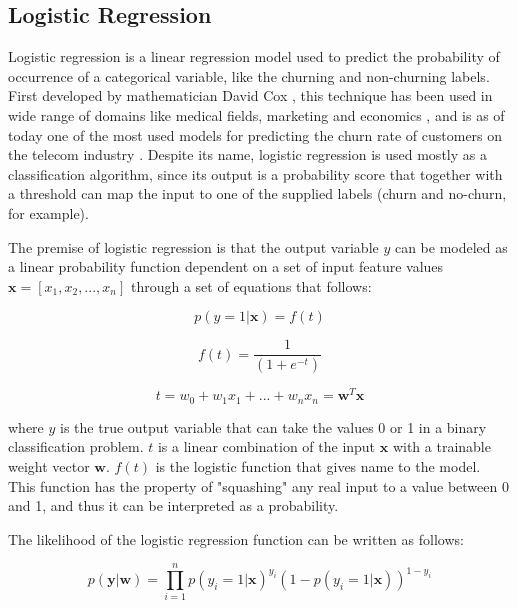 \documentclass{kththesis}
\begin{document}
\subsection{Logistic Regression}

Logistic regression is a linear regression model used to predict the probability of occurrence of a categorical variable, like the churning and non-churning labels. First developed by mathematician David Cox \citep{cox1958regression}, this technique has been used in wide range of domains like medical fields, marketing and economics , and is as of today one of the most used models for predicting the churn rate of customers on the telecom industry \citep{mahajan2015review}. Despite its name, logistic regression is used mostly as a classification algorithm, since its output is a probability score that together with a threshold can map the input to one of the supplied labels (churn and no-churn, for example).

The premise of logistic regression is that the output variable $y$ can be modeled as a linear probability function dependent on a set of input feature values  $\mathbf{x} = [x_1, x_2, ..., x_n]$ through a set of equations that follows:

\begin{equation}
p(y = 1|\mathbf{x}) = f(t)
\end{equation}

\begin{equation}
f(t) = \frac{1}{(1+e^{-t})}
\end{equation}

\begin{equation}
t = w_0 + w_1x_1 + ... + w_nx_n = \mathbf{w}^T\mathbf{x}
\end{equation}

where $y$ is the true output variable that can take the values 0 or 1 in a binary classification problem. $t$ is a linear combination of the input $\bm{x}$ with a trainable weight vector $\mathbf{w}$. $f(t)$ is the logistic function that gives name to the model. This function has the property of "squashing" any real input to a value between 0 and 1, and thus it can be interpreted as a probability. 

The likelihood of the logistic regression function can be written as follows:

\begin{equation}
p(\mathbf{y}|\mathbf{w}) = \prod_{i=1}^{n}  p(y_i=1|\mathbf{x})^{y_i} (1-p(y_i=1|\mathbf{x}))^{1-y_i}
\end{equation}
\end{document}
